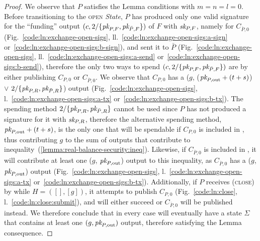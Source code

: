 \begin{proof}
  We observe that $P$ satisfies the Lemma conditions with $m = n = l = 0$.
  Before transitioning to the \textsc{open} \textit{State}, $P$ has produced
  only one valid signature for the ``funding'' output $(c, 2/\{\textit{pk}_{P, F},
  \textit{pk}_{\bar{P}, F}\})$ of $F$ with $\textit{sk}_{P, F}$, namely for $C_{\bar{P}, 0}$
  (Fig.~\ref{code:ln:exchange-open-sigs},
  ll.~\ref{code:ln:exchange-open-sigs:a-sign}
  or~\ref{code:ln:exchange-open-sigs:b-sign}), and sent it to $\bar{P}$
  (Fig.~\ref{code:ln:exchange-open-sigs},
  ll.~\ref{code:ln:exchange-open-sigs:a-send}
  or~\ref{code:ln:exchange-open-sigs:b-send}), therefore the only two ways to
  spend $(c, 2/\{\textit{pk}_{P, F}, \textit{pk}_{\bar{P}, F}\})$ are by either publishing $C_{P,
  0}$ or $C_{\bar{P}, 0}$. We observe that $C_{P, 0}$ has a ($g$, ($\textit{pk}_{P,
  \mathrm{out}} + (t + s)$) $\vee$ $2/\{\textit{pk}_{P, R}, \textit{pk}_{\bar{P}, R}\}$) output
  (Fig.~\ref{code:ln:exchange-open-sigs},
  l.~\ref{code:ln:exchange-open-sigs:a-tx}
  or~\ref{code:ln:exchange-open-sigs:b-tx}). The spending method $2/\{\textit{pk}_{P, R},
  \textit{pk}_{\bar{P}, R}\}$ cannot be used since $P$ has not produced a signature for
  it with $\textit{sk}_{P, R}$, therefore the alternative spending method, $\textit{pk}_{P,
  \mathrm{out}} + (t + s)$, is the only one that will be spendable if $C_{P, 0}$
  is included in \ledger, thus contributing $g$ to the sum of outputs that
  contribute to inequality~(\ref{lemma:real-balance-security:ineq}). Likewise,
  if $C_{\bar{P}, 0}$ is included in \ledger, it will contribute at least one
  ($g$, $\textit{pk}_{P, \mathrm{out}}$) output to this inequality, as $C_{\bar{P}, 0}$
  has a ($g$, $\textit{pk}_{P, \mathrm{out}}$) output
  (Fig.~\ref{code:ln:exchange-open-sigs},
  l.~\ref{code:ln:exchange-open-sigs:a-tx}
  or~\ref{code:ln:exchange-open-sigs:b-tx}). Additionally, if $P$ receives
  (\textsc{close}) by \environment while $H = ([], [g])$, it attempts to publish
  $C_{P, 0}$ (Fig.~\ref{code:ln:close}, l.~\ref{code:ln:close:submit}), and will
  either succeed or $C_{\bar{P}, 0}$ will be published instead. We therefore
  conclude that in every case \ledger will eventually have a state $\Sigma$ that
  contains at least one $(g, \textit{pk}_{P, \mathrm{out}})$ output, therefore satisfying
  the Lemma consequence.


\end{proof}
